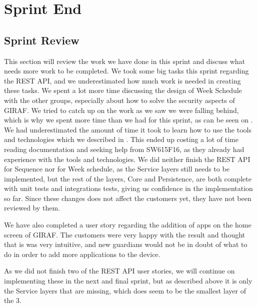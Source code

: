 \chapter{Sprint End}

\section{Sprint Review}\label{sec:sprintreview3}
This section will review the work we have done in this sprint and discuss what needs more work to be completed.
We took some big tasks this sprint regarding the REST API, and we underestimated how much work is needed in creating these tasks.
We spent a lot more time discussing the design of Week Schedule with the other groups, especially about how to solve the security aspects of GIRAF.
We tried to catch up on the work as we saw we were falling behind, which is why we spent more time than we had for this sprint, as can be seen on .
We had underestimated the amount of time it took to learn how to use the tools and technologies which we described in  .
This ended up costing a lot of time reading documentation and seeking help from SW615F16, as they already had experience with the tools and technologies.
We did neither finish the REST API for Sequence nor for Week schedule, as the Service layers still needs to be implemented, but the rest of the layers, Core and Persistence, are both complete with unit tests and integrations tests, giving us confidence in the implementation so far. 
Since these changes does not affect the customers yet, they have not been reviewed by them.

We have also completed a user story regarding the addition of apps on the home screen of GIRAF.
The customers were very happy with the result and thought that is was very intuitive, and new guardians would not be in doubt of what to do in order to add more applications to the device.

As we did not finish two of the REST API user stories, we will continue on implementing these in the next and final sprint, but as described above it is only the Service layers that are missing, which does seem to be the smallest layer of the 3.

